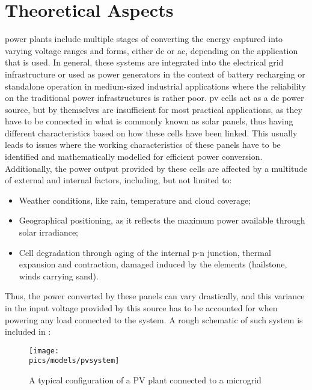 \chapter{Theoretical Aspects}
\label{chap:theoretical}

 power plants include multiple stages of converting the energy captured into varying voltage ranges and forms, either \gls{dc} or \gls{ac}, depending on the application that is used.
In general, these systems are integrated into the electrical grid infrastructure or used as power generators in the context of battery recharging or standalone operation in medium-sized industrial applications where the reliability on the traditional power infrastructures is rather poor. \cite{al2022photovoltaic}
\gls{pv} cells act as a \gls{dc} power source, but by themselves are insufficient for most practical applications, as they have to be connected in what is commonly known as solar panels, thus having different characteristics based on how these cells have been linked.
This usually leads to issues where the working characteristics of these panels have to be identified and mathematically modelled for efficient power conversion. \cite{al2022photovoltaic}
Additionally, the power output provided by these cells are affected by a multitude of external and internal factors, including, but not limited to:

\begin{itemize}
    \item Weather conditions, like rain, temperature and cloud coverage;
    \item Geographical positioning, as it reflects the maximum power available through solar irradiance;
    \item Cell degradation through aging of the internal p-n junction, thermal expansion and contraction, damaged induced by the elements (hailstone, winds carrying sand).
\end{itemize}

Thus, the power converted by these panels can vary drastically, and this variance in the input voltage provided by this source has to be accounted for when powering any load connected to the system.
A rough schematic of such system is included in :

\begin{figure}[!ht]
    \begin{center}\texttt{[image: \\pics/models/pvsystem]}\end{center}
    \caption{A typical configuration of a PV plant connected to a microgrid}
    \label{fig:pvsystem}
\end{figure}

